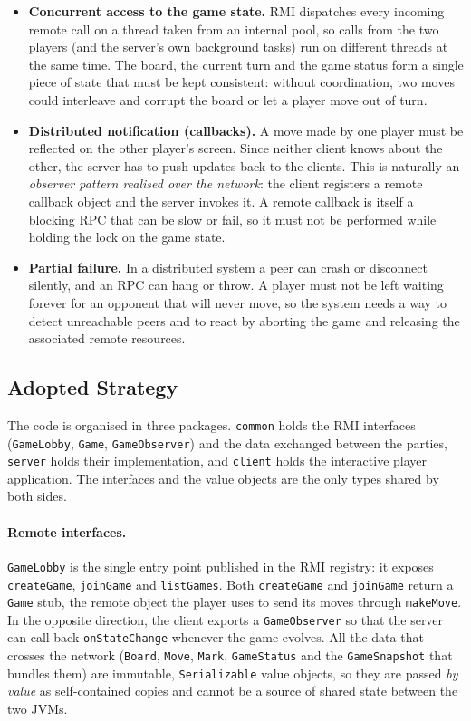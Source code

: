 \documentclass{scrartcl}
\begin{document}
\begin{itemize}
\item \textbf{Concurrent access to the game state.} RMI dispatches every incoming remote call on a thread taken from an internal pool, so calls from the two players (and the server's own background tasks) run on different threads at the same time. The board, the current turn and the game status form a single piece of state that must be kept consistent: without coordination, two moves could interleave and corrupt the board or let a player move out of turn.

\item \textbf{Distributed notification (callbacks).} A move made by one player must be reflected on the other player's screen. Since neither client knows about the other, the server has to push updates back to the clients. This is naturally an \emph{observer pattern realised over the network}: the client registers a remote callback object and the server invokes it. A remote callback is itself a blocking RPC that can be slow or fail, so it must not be performed while holding the lock on the game state.

\item \textbf{Partial failure.} In a distributed system a peer can crash or disconnect silently, and an RPC can hang or throw. A player must not be left waiting forever for an opponent that will never move, so the system needs a way to detect unreachable peers and to react by aborting the game and releasing the associated remote resources.
\end{itemize}

\subsection{Adopted Strategy}

The code is organised in three packages. \texttt{common} holds the RMI interfaces (\texttt{GameLobby}, \texttt{Game}, \texttt{GameObserver}) and the data exchanged between the parties, \texttt{server} holds their implementation, and \texttt{client} holds the interactive player application. The interfaces and the value objects are the only types shared by both sides.

\paragraph{Remote interfaces.} \texttt{GameLobby} is the single entry point published in the RMI registry: it exposes \texttt{createGame}, \texttt{joinGame} and \texttt{listGames}. Both \texttt{createGame} and \texttt{joinGame} return a \texttt{Game} stub, the remote object the player uses to send its moves through \texttt{makeMove}. In the opposite direction, the client exports a \texttt{GameObserver} so that the server can call back \texttt{onStateChange} whenever the game evolves. All the data that crosses the network (\texttt{Board}, \texttt{Move}, \texttt{Mark}, \texttt{GameStatus} and the \texttt{GameSnapshot} that bundles them) are immutable, \texttt{Serializable} value objects, so they are passed \emph{by value} as self-contained copies and cannot be a source of shared state between the two JVMs.
\end{document}
